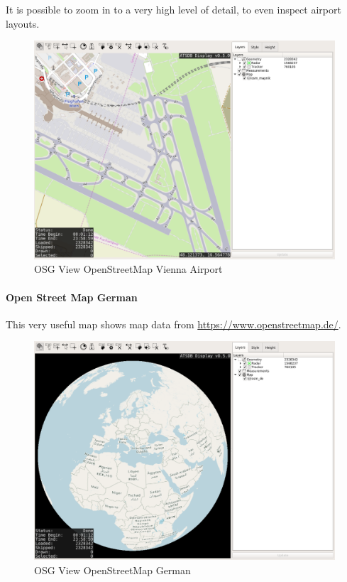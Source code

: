 It is possible to zoom in to a very high level of detail, to even inspect airport layouts.

\begin{figure}[H]
    \hspace*{-2.5cm}
    \includegraphics[width=19cm,frame]{../screenshots/osgview_osm_vienna.png}
  \caption{OSG View OpenStreetMap Vienna Airport}
\end{figure}

\newpage
\paragraph{Open Street Map German}

This very useful map shows map data from \url{https://www.openstreetmap.de/}.

\begin{figure}[H]
    \hspace*{-2.5cm}
    \includegraphics[width=19cm,frame]{../screenshots/osgview_osm_de.png}
  \caption{OSG View OpenStreetMap German}
\end{figure}

